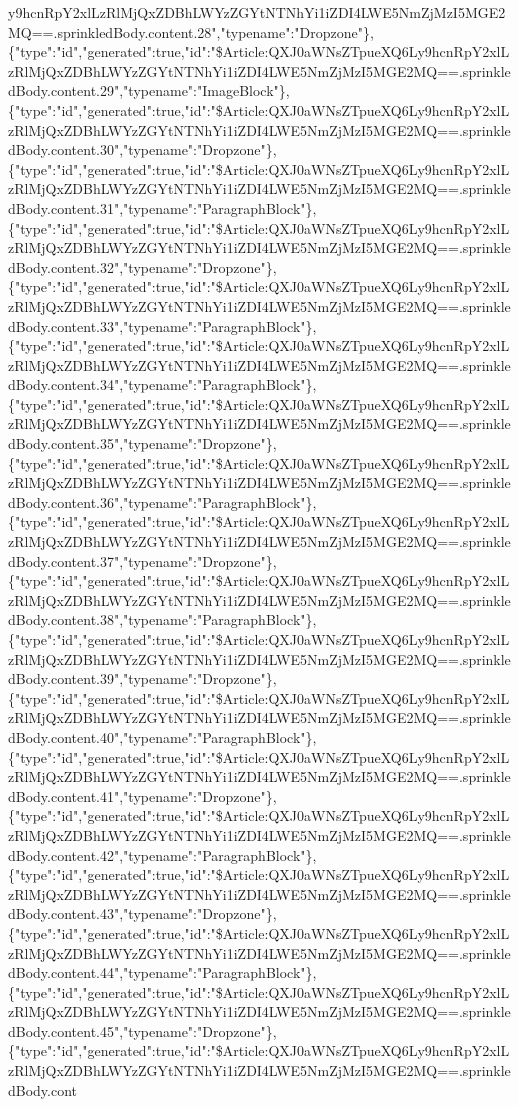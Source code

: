 y9hcnRpY2xlLzRlMjQxZDBhLWYzZGYtNTNhYi1iZDI4LWE5NmZjMzI5MGE2MQ==.sprinkledBody.content.28","typename":"Dropzone"\},\{"type":"id","generated":true,"id":"\$Article:QXJ0aWNsZTpueXQ6Ly9hcnRpY2xlLzRlMjQxZDBhLWYzZGYtNTNhYi1iZDI4LWE5NmZjMzI5MGE2MQ==.sprinkledBody.content.29","typename":"ImageBlock"\},\{"type":"id","generated":true,"id":"\$Article:QXJ0aWNsZTpueXQ6Ly9hcnRpY2xlLzRlMjQxZDBhLWYzZGYtNTNhYi1iZDI4LWE5NmZjMzI5MGE2MQ==.sprinkledBody.content.30","typename":"Dropzone"\},\{"type":"id","generated":true,"id":"\$Article:QXJ0aWNsZTpueXQ6Ly9hcnRpY2xlLzRlMjQxZDBhLWYzZGYtNTNhYi1iZDI4LWE5NmZjMzI5MGE2MQ==.sprinkledBody.content.31","typename":"ParagraphBlock"\},\{"type":"id","generated":true,"id":"\$Article:QXJ0aWNsZTpueXQ6Ly9hcnRpY2xlLzRlMjQxZDBhLWYzZGYtNTNhYi1iZDI4LWE5NmZjMzI5MGE2MQ==.sprinkledBody.content.32","typename":"Dropzone"\},\{"type":"id","generated":true,"id":"\$Article:QXJ0aWNsZTpueXQ6Ly9hcnRpY2xlLzRlMjQxZDBhLWYzZGYtNTNhYi1iZDI4LWE5NmZjMzI5MGE2MQ==.sprinkledBody.content.33","typename":"ParagraphBlock"\},\{"type":"id","generated":true,"id":"\$Article:QXJ0aWNsZTpueXQ6Ly9hcnRpY2xlLzRlMjQxZDBhLWYzZGYtNTNhYi1iZDI4LWE5NmZjMzI5MGE2MQ==.sprinkledBody.content.34","typename":"ParagraphBlock"\},\{"type":"id","generated":true,"id":"\$Article:QXJ0aWNsZTpueXQ6Ly9hcnRpY2xlLzRlMjQxZDBhLWYzZGYtNTNhYi1iZDI4LWE5NmZjMzI5MGE2MQ==.sprinkledBody.content.35","typename":"Dropzone"\},\{"type":"id","generated":true,"id":"\$Article:QXJ0aWNsZTpueXQ6Ly9hcnRpY2xlLzRlMjQxZDBhLWYzZGYtNTNhYi1iZDI4LWE5NmZjMzI5MGE2MQ==.sprinkledBody.content.36","typename":"ParagraphBlock"\},\{"type":"id","generated":true,"id":"\$Article:QXJ0aWNsZTpueXQ6Ly9hcnRpY2xlLzRlMjQxZDBhLWYzZGYtNTNhYi1iZDI4LWE5NmZjMzI5MGE2MQ==.sprinkledBody.content.37","typename":"Dropzone"\},\{"type":"id","generated":true,"id":"\$Article:QXJ0aWNsZTpueXQ6Ly9hcnRpY2xlLzRlMjQxZDBhLWYzZGYtNTNhYi1iZDI4LWE5NmZjMzI5MGE2MQ==.sprinkledBody.content.38","typename":"ParagraphBlock"\},\{"type":"id","generated":true,"id":"\$Article:QXJ0aWNsZTpueXQ6Ly9hcnRpY2xlLzRlMjQxZDBhLWYzZGYtNTNhYi1iZDI4LWE5NmZjMzI5MGE2MQ==.sprinkledBody.content.39","typename":"Dropzone"\},\{"type":"id","generated":true,"id":"\$Article:QXJ0aWNsZTpueXQ6Ly9hcnRpY2xlLzRlMjQxZDBhLWYzZGYtNTNhYi1iZDI4LWE5NmZjMzI5MGE2MQ==.sprinkledBody.content.40","typename":"ParagraphBlock"\},\{"type":"id","generated":true,"id":"\$Article:QXJ0aWNsZTpueXQ6Ly9hcnRpY2xlLzRlMjQxZDBhLWYzZGYtNTNhYi1iZDI4LWE5NmZjMzI5MGE2MQ==.sprinkledBody.content.41","typename":"Dropzone"\},\{"type":"id","generated":true,"id":"\$Article:QXJ0aWNsZTpueXQ6Ly9hcnRpY2xlLzRlMjQxZDBhLWYzZGYtNTNhYi1iZDI4LWE5NmZjMzI5MGE2MQ==.sprinkledBody.content.42","typename":"ParagraphBlock"\},\{"type":"id","generated":true,"id":"\$Article:QXJ0aWNsZTpueXQ6Ly9hcnRpY2xlLzRlMjQxZDBhLWYzZGYtNTNhYi1iZDI4LWE5NmZjMzI5MGE2MQ==.sprinkledBody.content.43","typename":"Dropzone"\},\{"type":"id","generated":true,"id":"\$Article:QXJ0aWNsZTpueXQ6Ly9hcnRpY2xlLzRlMjQxZDBhLWYzZGYtNTNhYi1iZDI4LWE5NmZjMzI5MGE2MQ==.sprinkledBody.content.44","typename":"ParagraphBlock"\},\{"type":"id","generated":true,"id":"\$Article:QXJ0aWNsZTpueXQ6Ly9hcnRpY2xlLzRlMjQxZDBhLWYzZGYtNTNhYi1iZDI4LWE5NmZjMzI5MGE2MQ==.sprinkledBody.content.45","typename":"Dropzone"\},\{"type":"id","generated":true,"id":"\$Article:QXJ0aWNsZTpueXQ6Ly9hcnRpY2xlLzRlMjQxZDBhLWYzZGYtNTNhYi1iZDI4LWE5NmZjMzI5MGE2MQ==.sprinkledBody.cont